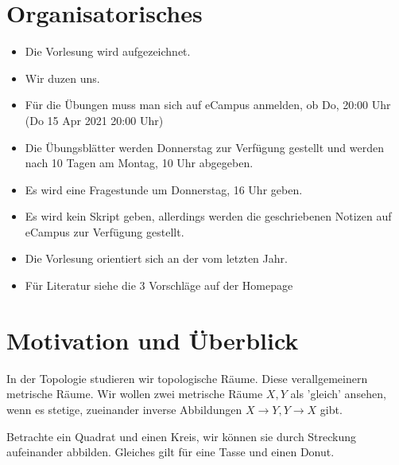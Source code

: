 \section*{Organisatorisches}
\begin{itemize}
\item    Die Vorlesung wird aufgezeichnet.
\item Wir duzen uns.
\item Für die Übungen muss man sich auf eCampus anmelden, ob Do, 20:00 Uhr (Do 15 Apr 2021 20:00 Uhr)
\item Die Übungsblätter werden Donnerstag zur Verfügung gestellt und werden nach 10 Tagen am Montag, 10 Uhr abgegeben.
\item Es wird eine Fragestunde um Donnerstag, 16 Uhr geben.
\item Es wird kein Skript geben, allerdings werden die geschriebenen Notizen auf eCampus zur Verfügung gestellt.
\item Die Vorlesung orientiert sich an der vom letzten Jahr.
\item Für Literatur siehe die 3 Vorschläge auf der Homepage
\end{itemize}

\setcounter{section}{-1}

\section{Motivation und Überblick}
In der Topologie studieren wir topologische Räume. Diese verallgemeinern metrische Räume. Wir wollen zwei metrische Räume $X,Y$ als 'gleich' ansehen, wenn es stetige, zueinander inverse Abbildungen  $X \to  Y, Y\to X$ gibt.
\begin{example}
    Betrachte ein Quadrat und einen Kreis, wir können sie durch Streckung aufeinander abbilden. Gleiches gilt für eine Tasse und einen Donut. \\
    \begin{minipage}{\textwidth}
    \centering
    \begin{minipage}{0.45\textwidth}
    \end{minipage}
    \begin{minipage}{0.45\textwidth}
    \end{minipage}
\end{minipage}
\end{example}




